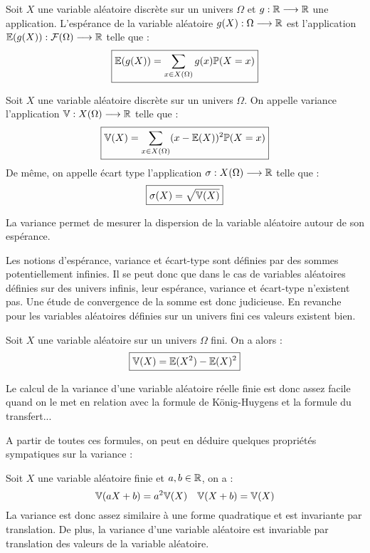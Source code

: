 \begin{theorem}[Transfert]
    Soit $X$ une variable aléatoire discrète sur un univers $\Omega$ et $g : \mathbb{R} \longrightarrow \mathbb{R}$ une application. 
    L'espérance de la variable aléatoire $g(X) : \Omega \longrightarrow \mathbb{R}$ est l'application $ \mathbb{E}(g(X)) : \mathcal{F}(\Omega) \longrightarrow \mathbb{R}$ 
    telle que : 
        \[ \boxed{ \mathbb{E}(g(X)) = \sum_{x \in X(\Omega)} g(x) \mathbb{P}(X = x) } \]  
\end{theorem}

\begin{definition}
    Soit $X$ une variable aléatoire discrète sur un univers $\Omega$. On appelle variance l'application 
    $\mathbb{V} : X(\Omega) \longrightarrow \mathbb{R}$ telle que :
        \[ \boxed { \mathbb{V}(X) = \sum_{x \in X(\Omega)} (x - \mathbb{E}(X))^2 \mathbb{P}(X = x) } \]
    De même, on appelle écart type l'application $ \sigma : X(\Omega) \longrightarrow \mathbb{R}$ telle que : 
        \[ \boxed{ \sigma(X) = \sqrt{\mathbb{V}(X)} } \]  
\end{definition}

La variance permet de mesurer la dispersion de la variable aléatoire autour de son espérance. 

\begin{remark}
    Les notions d'espérance, variance et écart-type sont définies par des sommes potentiellement infinies. 
    Il se peut donc que dans le cas de variables aléatoires définies sur des univers infinis, leur espérance, 
    variance et écart-type n'existent pas. Une étude de convergence de la somme est donc judicieuse. 
    En revanche pour les variables aléatoires définies sur un univers fini ces valeurs existent bien. 
\end{remark}

\begin{theorem}
    Soit $X$ une variable aléatoire sur un univers $\Omega$ fini. On a alors : 
        \[ \boxed{ \mathbb{V}(X) = \mathbb{E}(X^2) - \mathbb{E}(X)^2 } \]
\end{theorem}

\begin{remark}
    Le calcul de la variance d'une variable aléatoire réelle finie est donc assez facile quand on le met en relation 
    avec la formule de König-Huygens et la formule du transfert...
\end{remark}

A partir de toutes ces formules, on peut en déduire quelques propriétés sympatiques sur la variance :

\begin{prop}[Variance]
    Soit $X$ une variable aléatoire finie et $a,b \in \mathbb{R}$, on a :
        \[ \mathbb{V}(aX+b) = a^2 \mathbb{V}(X) \quad \mathbb{V}(X + b) = \mathbb{V}(X) \]
    La variance est donc assez similaire à une forme quadratique et est invariante par translation. 
    De plus, la variance d'une variable aléatoire est invariable par translation des valeurs de la variable aléatoire. 
\end{prop}

